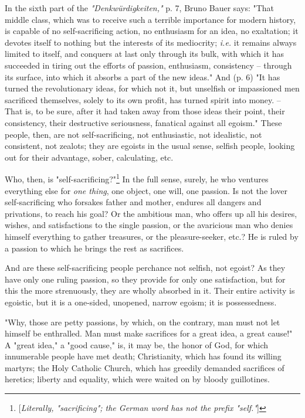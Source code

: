 In the sixth part of the \textit{"{}Denkw\"urdigkeiten,"{}} p. 7, Bruno Bauer 
says: "{}That middle class, which was to receive such a terrible importance 
for modern history, is capable of no self-sacrificing action, no enthusiasm 
for an idea, no exaltation; it devotes itself to nothing but the interests of 
its mediocrity; \textit{i.e.} it remains always limited to itself, and 
conquers at last only through its bulk, with which it has succeeded in tiring 
out the efforts of passion, enthusiasm, consistency -- through its surface, 
into which it absorbs a part of the new ideas."{} And (p. 6) "{}It has turned 
the revolutionary ideas, for which not it, but unselfish or impassioned men 
sacrificed themselves, solely to its own profit, has turned spirit into money. 
-- That is, to be sure, after it had taken away from those ideas their point, 
their consistency, their destructive seriousness, fanatical against all 
egoism."{} These people, then, are not self-sacrificing, not enthusiastic, not 
idealistic, not consistent, not zealots; they are egoists in the usual sense, 
selfish people, looking out for their advantage, sober, calculating, etc.

Who, then, is "{}self-sacrificing?"{}\footnote{[\textit{Literally, 
"{}sacrificing"{}; the German word has not the prefix "{}self."{}}]} In the 
full sense, surely, he who ventures everything else for \textit{one thing}, 
one object, one will, one passion. Is not the lover self-sacrificing who 
forsakes father and mother, endures all dangers and privations, to reach his 
goal? Or the ambitious man, who offers up all his desires, wishes, and 
satisfactions to the single passion, or the avaricious man who denies himself 
everything to gather treasures, or the pleasure-seeker, etc.? He is ruled by a 
passion to which he brings the rest as sacrifices.

And are these self-sacrificing people perchance not selfish, not egoist? As 
they have only one ruling passion, so they provide for only one satisfaction, 
but for this the more strenuously, they are wholly absorbed in it. Their 
entire activity is egoistic, but it is a one-sided, unopened, narrow egoism; 
it is possessedness.

"{}Why, those are petty passions, by which, on the contrary, man must not let 
himself be enthralled. Man must make sacrifices for a great idea, a great 
cause!"{} A "{}great idea,"{} a "{}good cause,"{} is, it may be, the honor of 
God, for which innumerable people have met death; Christianity, which has 
found its willing martyrs; the Holy Catholic Church, which has greedily 
demanded sacrifices of heretics; liberty and equality, which were waited on by 
bloody guillotines.

